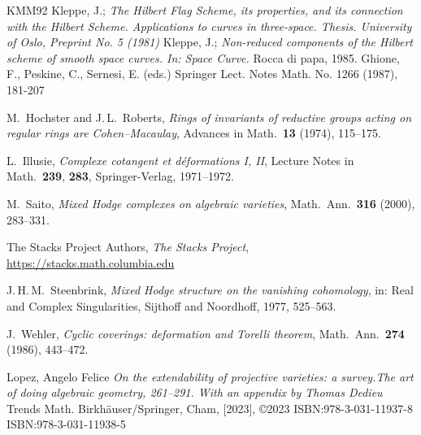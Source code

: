 \documentclass[11pt,twoside]{amsart}
\theoremstyle{plain}
\numberwithin{equation}{section}
\theoremstyle{definition}
\begin{document}
\begin{thebibliography}{KMM92}
Kleppe, J.; 
\emph{The Hilbert Flag Scheme, its properties, and its connection with the Hilbert Scheme. Applications to curves in three-space. Thesis. University of Oslo, Preprint No. 5 (1981)}
Kleppe, J.;
\emph{Non-reduced components of the Hilbert scheme of smooth space curves. In: Space Curve.}
Rocca di papa, 1985. Ghione, F., Peskine, C., Sernesi, E. (eds.) Springer Lect. Notes Math. No. 1266 (1987), 181-207

 M.~Hochster and J.\,L.~Roberts, \emph{Rings of invariants of reductive groups acting on regular rings are Cohen--Macaulay}, Advances in Math.\ \textbf{13} (1974), 115--175.
 
 L.~Illusie, \emph{Complexe cotangent et d\'eformations I, II}, Lecture Notes in Math.\ \textbf{239}, \textbf{283}, Springer-Verlag, 1971--1972.
 
 M.~Saito, \emph{Mixed Hodge complexes on algebraic varieties}, Math.\ Ann.\ \textbf{316} (2000), 283--331.

The Stacks Project Authors,
\emph{The Stacks Project},
\url{https://stacks.math.columbia.edu}
 
 J.\,H.\,M.~Steenbrink, \emph{Mixed Hodge structure on the vanishing cohomology}, in: Real and Complex Singularities, Sijthoff and Noordhoff, 1977, 525--563.
 
 J.~Wehler, \emph{Cyclic coverings: deformation and Torelli theorem}, Math.\ Ann.\ \textbf{274} (1986), 443--472.

  












\color{black}



Lopez, Angelo Felice
\emph{On the extendability of projective varieties: a survey.The art of doing algebraic geometry, 261–291. With an appendix by Thomas Dedieu}
Trends Math. Birkhäuser/Springer, Cham, [2023], ©2023 ISBN:978-3-031-11937-8
ISBN:978-3-031-11938-5



\end{thebibliography}
\end{document}
